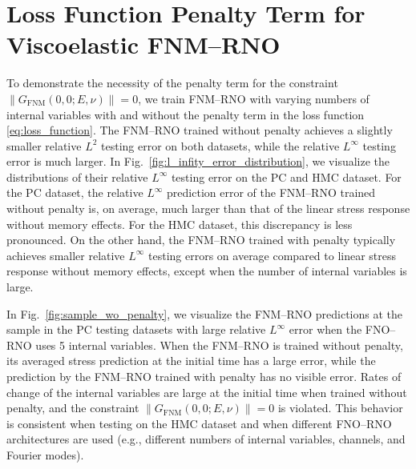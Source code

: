 \documentclass[letterpaper,11pt]{article}
\begin{document}
\section{Loss Function Penalty Term for Viscoelastic FNM--RNO}\label{appsec:penalty}

To demonstrate the necessity of the penalty term for the constraint $\|G_{\text{FNM}}(0, 0; E,\nu)\| = 0$, we train FNM--RNO with varying numbers of internal variables with and without the penalty term in the loss function \eqref{eq:loss_function}. The FNM--RNO trained without penalty achieves a slightly smaller relative $L^2$ testing error on both datasets, while the relative $L^{\infty}$ testing error is much larger. In Fig.~\ref{fig:l_infity_error_distribution}, we visualize the distributions of their relative $L^{\infty}$ testing error on the PC and HMC dataset. For the PC dataset, the relative $L^{\infty}$ prediction error of the FNM--RNO trained without penalty is, on average, much larger than that of the linear stress response without memory effects. For the HMC dataset, this discrepancy is less pronounced. On the other hand, the FNM--RNO trained with penalty typically achieves smaller relative $L^{\infty}$ testing errors on average compared to linear stress response without memory effects, except when the number of internal variables is large. 

In Fig.~\ref{fig:sample_wo_penalty}, we visualize the FNM--RNO predictions at the sample in the PC testing datasets with large relative $L^{\infty}$ error when the FNO--RNO uses 5 internal variables. When the FNM--RNO is trained without penalty, its averaged stress prediction at the initial time has a large error, while the prediction by the FNM--RNO trained with penalty has no visible error. Rates of change of the internal variables are large at the initial time when trained without penalty, and the constraint $\|G_{\text{FNM}}(0, 0; E, \nu)\|=0$ is violated. This behavior is consistent when testing on the HMC dataset and when different FNO--RNO architectures are used  (e.g., different numbers of internal variables, channels, and Fourier modes).
\end{document}
